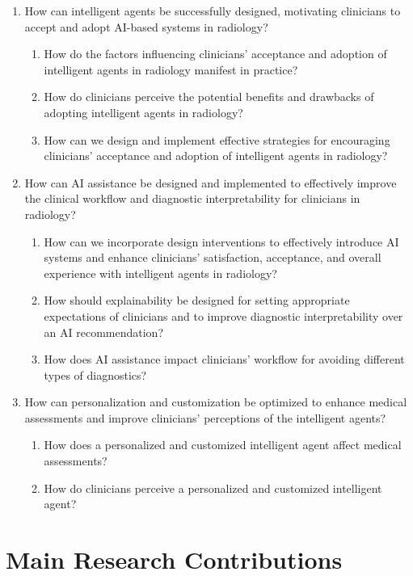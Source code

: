 \begin{enumerate}
\item How can intelligent agents be successfully designed, motivating clinicians to accept and adopt \ac{AI}-based systems in radiology?
\begin{enumerate}
\item How do the factors influencing clinicians' acceptance and adoption of intelligent agents in radiology manifest in practice?
\item How do clinicians perceive the potential benefits and drawbacks of adopting intelligent agents in radiology?
\item How can we design and implement effective strategies for encouraging clinicians' acceptance and adoption of intelligent agents in radiology?
\end{enumerate}
\item How can \ac{AI} assistance be designed and implemented to effectively improve the clinical workflow and diagnostic interpretability for clinicians in radiology?
\begin{enumerate}
\item How can we incorporate design interventions to effectively introduce \ac{AI} systems and enhance clinicians' satisfaction, acceptance, and overall experience with intelligent agents in radiology?
\item How should explainability be designed for setting appropriate expectations of clinicians and to improve diagnostic interpretability over an AI recommendation?
\item How does AI assistance impact clinicians' workflow for avoiding different types of diagnostics?
\end{enumerate}
\item How can personalization and customization be optimized to enhance medical assessments and improve clinicians' perceptions of the intelligent agents?
\begin{enumerate}
\item How does a personalized and customized intelligent agent affect medical assessments?
\item How do clinicians perceive a personalized and customized intelligent agent?
\end{enumerate}
\end{enumerate}

\section{Main Research Contributions}
\label{sec:chap001005}


